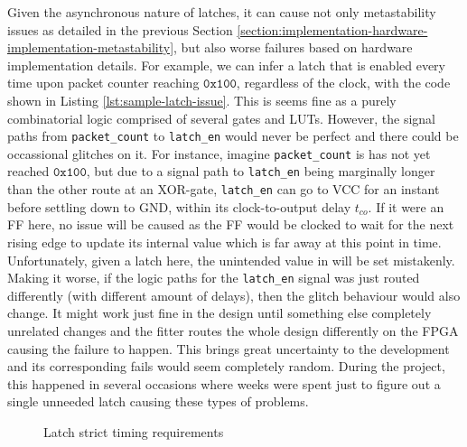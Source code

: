 \documentclass[a4paper]{report}
\newcommand{\code}{\texttt}
\begin{document}
Given the asynchronous nature of latches, it can cause not only metastability issues as detailed in the previous Section \ref{section:implementation-hardware-implementation-metastability}, but also worse failures based on hardware implementation details. For example, we can infer a latch that is enabled every time upon packet counter reaching $\mathtt{0x100}$, regardless of the clock, with the code shown in Listing \ref{lst:sample-latch-issue}. This is seems fine as a purely combinatorial logic comprised of several gates and LUTs. However, the signal paths from \code{packet\_count} to \code{latch\_en} would never be perfect and there could be occassional glitches on it. For instance, imagine \code{packet\_count} is has not yet reached $\mathtt{0x100}$, but due to a signal path to \code{latch\_en} being marginally longer than the other route at an XOR-gate, \code{latch\_en} can go to VCC for an instant before settling down to GND, within its clock-to-output delay $t_{co}$. If it were an FF here, no issue will be caused as the FF would be clocked to wait for the next rising edge to update its internal value which is far away at this point in time. Unfortunately, given a latch here, the unintended value in will be set mistakenly. Making it worse, if the logic paths for the \code{latch\_en} signal was just routed differently (with different amount of delays), then the glitch behaviour would also change. It might work just fine in the design until something else completely unrelated changes and the fitter routes the whole design differently on the FPGA causing the failure to happen. This brings great uncertainty to the development and its corresponding fails would seem completely random. During the project, this happened in several occasions where weeks were spent just to figure out a single unneeded latch causing these types of problems.

\begin{figure}[h!]
  \caption{Latch strict timing requirements \cite{jensen-2020}}
  \label{fig:latch-timing}
\end{figure}
\end{document}
